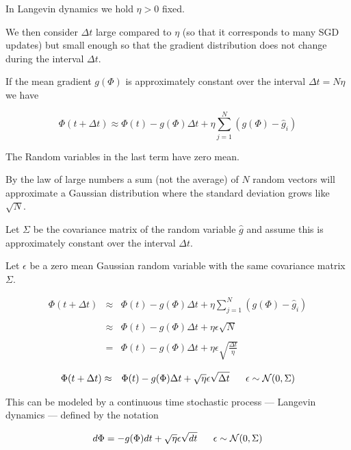 {\vfill
In Langevin dynamics we hold $\eta > 0$ fixed.

\vfill
We then consider $\Delta t$ large compared to $\eta$ (so that it corresponds to many SGD updates) but
small enough so that the gradient distribution does not change during the interval $\Delta t$.


If the mean gradient $g(\Phi)$ is approximately constant over the interval $\Delta t = N \eta$ we have

$$\Phi(t + \Delta t)  \approx \Phi(t) -g(\Phi)\Delta t + \eta \sum_{j=1}^N (g(\Phi) - \hat{g}_i)$$

\vfill
The Random variables in the last term have zero mean.

\vfill
By the law of large numbers a sum (not the average) of $N$ random vectors will approximate a Gaussian distribution where the standard deviation
grows like $\sqrt{N}$.


Let $\Sigma$ be the covariance matrix of the random variable $\hat{g}$ and assume this is approximately constant over the interval $\Delta t$.

\vfill
Let $\epsilon$ be a zero mean Gaussian random variable with the same covariance matrix $\Sigma$.

\begin{eqnarray*}
\Phi(t + \Delta t) & \approx & \Phi(t) -g(\Phi)\Delta t + \eta \sum_{j=1}^N (g(\Phi) - \hat{g}_i) \\
\\
& \approx & \Phi(t) -g(\Phi)\Delta t + \eta \epsilon \sqrt{N} \\
\\
& = & \Phi(t) -g(\Phi)\Delta t + \eta \epsilon \sqrt{\frac{\Delta t}{\eta}}
\end{eqnarray*}



\begin{eqnarray*}
\Phi(t + \Delta t) & \approx & \Phi(t) -g(\Phi)\Delta t + \sqrt{\eta} \epsilon \sqrt{\Delta t}\;\;\;\;\;\; \epsilon \sim {\cal N}(0,\Sigma)
\end{eqnarray*}

\vfill
This can be modeled by a continuous time stochastic process --- Langevin dynamics --- defined by the notation

$$d\Phi =  -g(\Phi)dt + \sqrt{\eta} \epsilon \sqrt{dt}\;\;\;\;\;\; \epsilon \sim {\cal N}(0,\Sigma)$$

}

